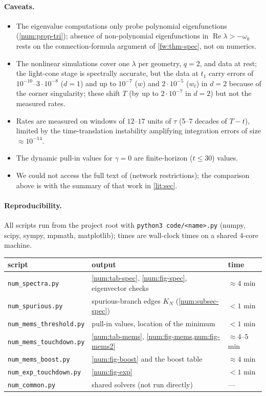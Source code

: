 \paragraph{Caveats.}
\begin{itemize}[leftmargin=1.4em,itemsep=1pt]
\item The eigenvalue computations only probe polynomial eigenfunctions
  (\cref{num:prop-tri}); absence of non-polynomial eigenfunctions in
  $\operatorname{Re}\lambda>-\omega_k$ rests on the connection-formula
  argument of \cref{fw:thm-spec}, not on numerics.
\item The nonlinear simulations cover one $\lambda$ per geometry, $q=2$, and
  data at rest; the light-cone stage is spectrally accurate, but the data at
  $t_1$ carry errors of $10^{-10}$--$3\cdot10^{-8}$ ($d=1$) and up to $10^{-7}$
  ($w$) and $2\cdot10^{-5}$ ($w_t$) in $d=2$ because of the corner singularity;
  these shift $T$ (by up to $2\cdot10^{-7}$ in $d=2$) but not the measured rates.
\item Rates are measured on windows of $12$--$17$ units of $\tau$ (5--7 decades
  of $T-t$), limited by the time-translation instability amplifying
  integration errors of size $\approx10^{-14}$.
\item The dynamic pull-in values for $\gamma=0$ are finite-horizon ($t\le30$) values.
\item We could not access the full text of \cite{GimperleinHeLacey2022}
  (network restrictions); the comparison above is with the summary of that
  work in \cref{lit:sec}.
\end{itemize}

\paragraph{Reproducibility.} All scripts run from the project root with
\texttt{python3 code/<name>.py} (numpy, scipy, sympy, mpmath, matplotlib);
times are wall-clock times on a shared 4-core machine.
\begin{center}\small
\begin{tabular}{@{}lll@{}}
\toprule
script & output & time\\
\midrule
\texttt{num\_spectra.py} & \cref{num:tab-spec}, \cref{num:fig-spec}, eigenvector checks & $\approx4$ min\\
\texttt{num\_spurious.py} & spurious-branch edges $K_N$ (\cref{num:subsec-spec}) & $<1$ min\\
\texttt{num\_mems\_threshold.py} & pull-in values, location of the minimum & $<1$ min\\
\texttt{num\_mems\_touchdown.py} & \cref{num:tab-mems}, \cref{num:fig-mems,num:fig-mems2} & $\approx4$--$5$ min\\
\texttt{num\_mems\_boost.py} & \cref{num:fig-boost} and the boost table & $\approx4$ min\\
\texttt{num\_exp\_touchdown.py} & \cref{num:fig-exp} & $<1$ min\\
\texttt{num\_common.py} & shared solvers (not run directly) & ---\\
\bottomrule
\end{tabular}
\end{center}

